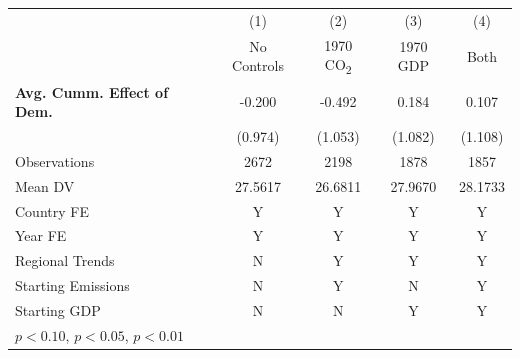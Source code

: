 \begin{tabular}{l*{4}{c}}
\hline
            &\multicolumn{1}{c}{(1)}&\multicolumn{1}{c}{(2)}&\multicolumn{1}{c}{(3)}&\multicolumn{1}{c}{(4)}\\
            &\multicolumn{1}{c}{No Controls}&\multicolumn{1}{c}{1970 CO\textsubscript{2}}&\multicolumn{1}{c}{1970 GDP}&\multicolumn{1}{c}{Both}\\
\hline
\textbf{Avg. Cumm. Effect of Dem.}&      -0.200         &      -0.492         &       0.184         &       0.107         \\
            &     (0.974)         &     (1.053)         &     (1.082)         &     (1.108)         \\
\midrule
Observations&        2672         &        2198         &        1878         &        1857         \\
Mean DV     &     27.5617         &     26.6811         &     27.9670         &     28.1733         \\
Country FE  &           Y         &           Y         &           Y         &           Y         \\
Year FE     &           Y         &           Y         &           Y         &           Y         \\
Regional Trends&           N         &           Y         &           Y         &           Y         \\
Starting Emissions&           N         &           Y         &           N         &           Y         \\
Starting GDP&           N         &           N         &           Y         &           Y         \\
\hline
\multicolumn{5}{l}{\footnotesize \sym{*} \(p<0.10\), \sym{**} \(p<0.05\), \sym{***} \(p<0.01\)}\\
\end{tabular}
